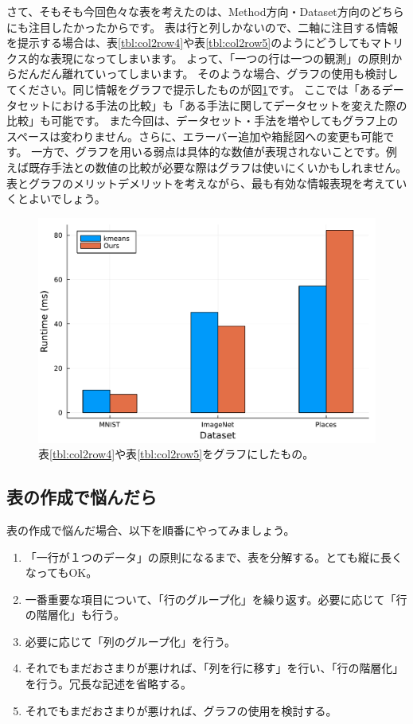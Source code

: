 \documentclass[uplatex,onecolumn,9pt,dvipdfmx]{jsarticle}
\newcommand{\Tref}[1]{表\ref{#1}}
\newcommand{\Fref}[1]{図\ref{#1}}
\begin{document}
さて、そもそも今回色々な表を考えたのは、Method方向・Dataset方向のどちらにも注目したかったからです。
表は行と列しかないので、二軸に注目する情報を提示する場合は、\Tref{tbl:col2row4}や\Tref{tbl:col2row5}のようにどうしてもマトリクス的な表現になってしまいます。
よって、「一つの行は一つの観測」の原則からだんだん離れていってしまいます。
そのような場合、グラフの使用も検討してください。同じ情報をグラフで提示したものが\Fref{fig:single_val}です。
ここでは「あるデータセットにおける手法の比較」も「ある手法に関してデータセットを変えた際の比較」も可能です。
また今回は、データセット・手法を増やしてもグラフ上のスペースは変わりません。さらに、エラーバー追加や箱髭図への変更も可能です。
一方で、グラフを用いる弱点は具体的な数値が表現されないことです。例えば既存手法との数値の比較が必要な際はグラフは使いにくいかもしれません。
表とグラフのメリットデメリットを考えながら、最も有効な情報表現を考えていくとよいでしょう。

\begin{figure}[h]
    \centering
    \includegraphics[width=0.5\linewidth]{script/single_val.pdf}
    \caption{\Tref{tbl:col2row4}や\Tref{tbl:col2row5}をグラフにしたもの。}
    \label{fig:single_val}
\end{figure}





\subsection{表の作成で悩んだら}
表の作成で悩んだ場合、以下を順番にやってみましょう。
\begin{enumerate}
    \item 「一行が１つのデータ」の原則になるまで、表を分解する。とても縦に長くなってもOK。
    \item 一番重要な項目について、「行のグループ化」を繰り返す。必要に応じて「行の階層化」も行う。
    \item 必要に応じて「列のグループ化」を行う。
    \item それでもまだおさまりが悪ければ、「列を行に移す」を行い、「行の階層化」を行う。冗長な記述を省略する。
    \item それでもまだおさまりが悪ければ、グラフの使用を検討する。
\end{enumerate}
\end{document}
